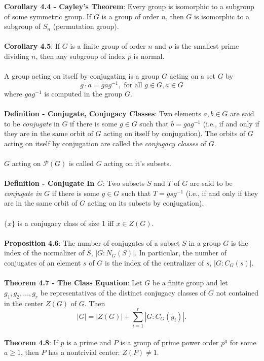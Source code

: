 \documentclass{article}
\begin{document}
\textbf{Corollary 4.4 - Cayley's Theorem}: Every group is isomorphic to a subgroup of some symmetric group. If $G$ is a group of order $n$, then $G$ is isomorphic to a subgroup of $S_n$ (permutation group). \\ \\
\textbf{Corollary 4.5}: If $G$ is a finite group of order $n$ and $p$ is the smallest prime dividing $n$, then any subgroup of index $p$ is normal. \\ \\
A group acting on itself by conjugating is a group $G$ acting on a set $G$ by $$g \cdot a = gag^{-1}, \text{ for all } g \in G, a \in G$$ where $gag^{-1}$ is computed in the group $G$. \\ \\
\textbf{Definition - Conjugate, Conjugacy Classes}: Two elements $a, b \in G$ are said to be \textit{conjugate} in $G$ if there is some $g \in G$ such that $b = gag^{-1}$ (i.e., if and only if they are in the same orbit of $G$ acting on itself by conjugation). The orbits of $G$ acting on itself by conjugation are called the \textit{conjugacy classes} of $G$. \\ \\
$G$ acting on $\mathcal{P}(G)$ is called $G$ acting on it's subsets. \\ \\
\textbf{Definition - Conjugate In $G$}: Two subsets $S$ and $T$ of $G$ are said to be \textit{conjugate in} $G$ if there is some $g \in G$ such that $T = gsg^{-1}$ (i.e., if and only if they are in the same orbit of $G$ acting on its subsets by conjugation). \\ \\
$\{x\}$ is a conjugacy class of size 1 iff $x \in Z(G)$. \\ \\
\textbf{Proposition 4.6}: The number of conjugates of a subset $S$ in a group $G$ is the index of the normalizer of $S$, $|G : N_G(S)|$. In particular, the number of conjugates of an element $s$ of $G$ is the index of the centralizer of $s$, $|G : C_G(s)|$. \\ \\
\textbf{Theorem 4.7 - The Class Equation}: Let $G$ be a finite group and let $g_1 , g_2 , \dots, g_r$ be representatives of the distinct conjugacy classes of $G$ not contained in the center $Z(G)$ of $G$. Then $$|G| = |Z(G)| + \sum_{i = 1}^r |G : C_G(g_i)|.$$ \\
\textbf{Theorem 4.8}: If $p$ is a prime and $P$ is a group of prime power order $p^a$ for some $a \geq 1$, then $P$ has a nontrivial center: $Z(P) \neq 1$. \\ \\
\end{document}
